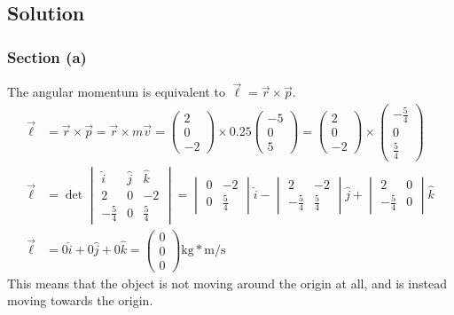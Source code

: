 \documentclass[12pt]{article}
\begin{document}
\subsection{Solution}
\subsubsection{Section (a)}
The angular momentum is equivalent to \(\vec{\ell} = \vec{r}\times\vec{p}\).
\begin{align}
    \vec{\ell}  &=  \vec{r} \times \vec{p}
        =   \vec{r} \times m\vec{v}
        =   \begin{pmatrix}2\\0\\-2\end{pmatrix} \times 0.25\begin{pmatrix}-5\\0\\5\end{pmatrix}
        =   \begin{pmatrix}2\\0\\-2\end{pmatrix} \times \begin{pmatrix}-\frac{5}{4}\\0\\\frac{5}{4}\end{pmatrix}\\
    \vec{\ell}  &=  \det\begin{vmatrix}
                            \hat{i} &\hat{j}&\hat{k}\\
                            2       &0      &-2     \\
                            -\frac{5}{4}&0  &\frac{5}{4}
                        \end{vmatrix}
        =   \begin{vmatrix}0&-2\\0&\frac{5}{4}\end{vmatrix}\hat{i} -
            \begin{vmatrix}2&-2\\-\frac{5}{4}&\frac{5}{4}\end{vmatrix}\hat{j} + 
            \begin{vmatrix}2&0\\-\frac{5}{4}&0\end{vmatrix}\hat{k}\\
    \vec{\ell}  &=  0\hat{i} + 0\hat{j} + 0\hat{k} 
        = \boxed{\begin{pmatrix}0\\0\\0\end{pmatrix}\unit{\kilo\gram*\meter/\second}}
\end{align}
This means that the object is not moving around the origin at all, and is instead moving towards the origin. 
\end{document}
